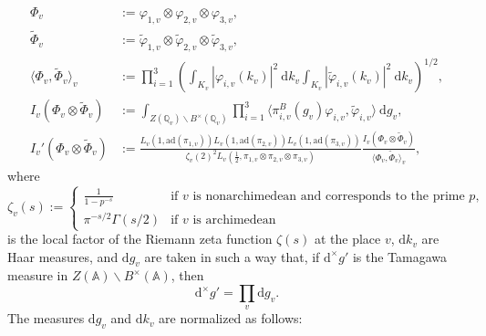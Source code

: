 \documentclass[11pt]{amsart}
\theoremstyle{definition}
\begin{document}
\begin{align*}
    \Phi_{v} &:= \varphi_{1,v} \otimes \varphi_{2,v} \otimes \varphi_{3,v}, \\
    \widetilde{\Phi}_{v} &:= \widetilde{\varphi}_{1,v} \otimes \widetilde{\varphi}_{2,v} \otimes \widetilde{\varphi}_{3,v}, \\
    \langle \Phi_{v}, \widetilde{\Phi}_{v} \rangle_{v} &:= \prod_{i=1}^{3} \left( \int_{K_v} |\varphi_{i,v}(k_{v})|^2 \: \mathrm{d}k_{v} \int_{K_v} |\widetilde{\varphi}_{i,v}(k_v)|^2 \: \mathrm{d}k_v \right)^{1/2}, \\
    I_v(\Phi_{v} \otimes \widetilde{\Phi}_{v}) &:= \int_{Z(\mathbb{Q}_{v}) \backslash B^{\times}(\mathbb{Q}_{v})} \prod_{i=1}^{3} \langle \pi_{i,v}^{B}(g_v) \varphi_{i,v}, \widetilde{\varphi}_{i,v} \rangle \: \mathrm{d}g_{v}, \\
    I_{v}'(\Phi_{v} \otimes \widetilde{\Phi}_{v} ) &:= \frac{L_v(1,\mathrm{ad}(\pi_{1,v})) L_v(1,\mathrm{ad}(\pi_{2,v})) L_v(1,\mathrm{ad}(\pi_{3,v}))}{\zeta_{v}(2)^2 L_v(\frac{1}{2},\pi_{1,v} \otimes \pi_{2,v} \otimes \pi_{3,v})} \frac{I_v(\Phi_{v} \otimes \widetilde{\Phi}_{v})}{\langle \Phi_{v}, \widetilde{\Phi}_{v} \rangle_v},
\end{align*}
where $$ \zeta_v(s) := \left\{ \begin{array}{ll}
    \frac{1}{1-p^{-s}} & \text{if } v \text{ is nonarchimedean and corresponds to the prime } p, \\
    \pi^{-s/2} \Gamma(s/2) & \text{if } v \text{ is archimedean}
\end{array} \right. $$ is the local factor of the Riemann zeta function $\zeta(s)$ at the place $v$, $\mathrm{d}k_{v}$ are Haar measures, and $\mathrm{d}g_{v}$ are taken in such a way that, if $\mathrm{d}^{\times} g'$ is the Tamagawa measure in $Z(\mathbb{A}) \backslash B^{\times}(\mathbb{A})$, then $$ \mathrm{d}^{\times} g' = \prod_{v} \mathrm{d}g_{v}.$$ The measures $\mathrm{d}g_{v}$ and $\mathrm{d}k_v$ are normalized as follows:
\end{document}
